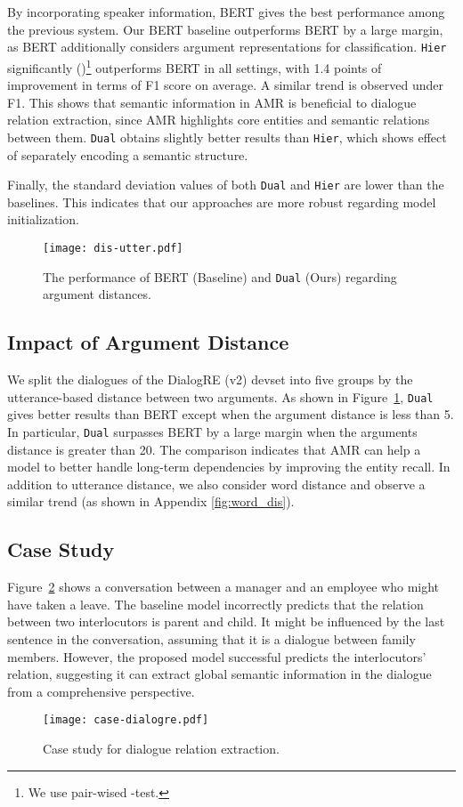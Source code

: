 \documentclass[11pt,a4paper]{article}
\begin{document}
By incorporating speaker information, BERT gives the best performance among the previous system.
Our BERT baseline outperforms BERT by a large margin, as BERT additionally considers argument representations for classification.
\texttt{Hier} significantly ()\footnote{We use pair-wised -test.} outperforms BERT in all settings, with 1.4 points of improvement in terms of F1 score on average.
A similar trend is observed under F1.
This shows that semantic information in AMR is beneficial to dialogue relation extraction, since AMR highlights core entities and semantic relations between them.
\texttt{Dual} obtains slightly better results than \texttt{Hier}, which shows effect of separately encoding a semantic structure.


Finally, the standard deviation values of both \texttt{Dual} and \texttt{Hier} are lower than the baselines. 
This indicates that our approaches are more robust regarding model initialization.
\begin{figure}
    \centering
    \texttt{[image: dis-utter.pdf]}
    \caption{The performance of BERT (Baseline) and \texttt{Dual} (Ours) regarding argument distances.}
    \label{fig:dis-utter}
\end{figure}
\subsection{Impact of Argument Distance}
We split the dialogues of the DialogRE (v2) devset into five groups by the utterance-based distance between two arguments.
As shown in Figure~\ref{fig:dis-utter}, \texttt{Dual} gives better results than BERT except when the argument distance is less than 5.
In particular, \texttt{Dual} surpasses BERT by a large margin when the arguments distance is greater than 20.
The comparison indicates that AMR can help a model to better handle long-term dependencies by improving the entity recall.
In addition to utterance distance, we also consider word distance and observe a similar trend (as shown in Appendix \ref{fig:word_dis}).

\subsection{Case Study}
\label{sec:caseRE}
Figure~\ref{case_re} shows a conversation between a manager and an employee who might have taken a leave.
The baseline model incorrectly predicts that the relation between two interlocutors is parent and child.
It might be influenced by the last sentence in the conversation, assuming that it is a dialogue between family members.
However, the proposed model successful predicts the interlocutors' relation, suggesting it can extract global semantic information in the dialogue from a comprehensive perspective.
\begin{figure}[t]
    \centering
    \texttt{[image: case-dialogre.pdf]}
    \caption{Case study for dialogue relation extraction.}
    \label{case_re}
\end{figure}
\end{document}
